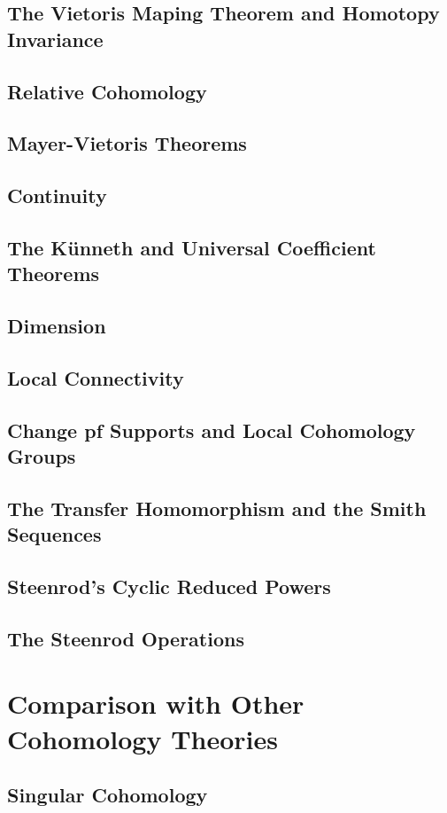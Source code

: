 \subsection{The Vietoris Maping Theorem and Homotopy Invariance}
\subsection{Relative Cohomology}
\subsection{Mayer-Vietoris Theorems}
\subsection{Continuity}
\subsection{The Künneth and Universal Coefficient Theorems}
\subsection{Dimension}
\subsection{Local Connectivity}
\subsection{Change pf Supports and Local Cohomology Groups}
\subsection{The Transfer Homomorphism and the Smith Sequences}
\subsection{Steenrod's Cyclic Reduced Powers}
\subsection{The Steenrod Operations}

\section{Comparison with Other Cohomology Theories}
\subsection{Singular Cohomology}
